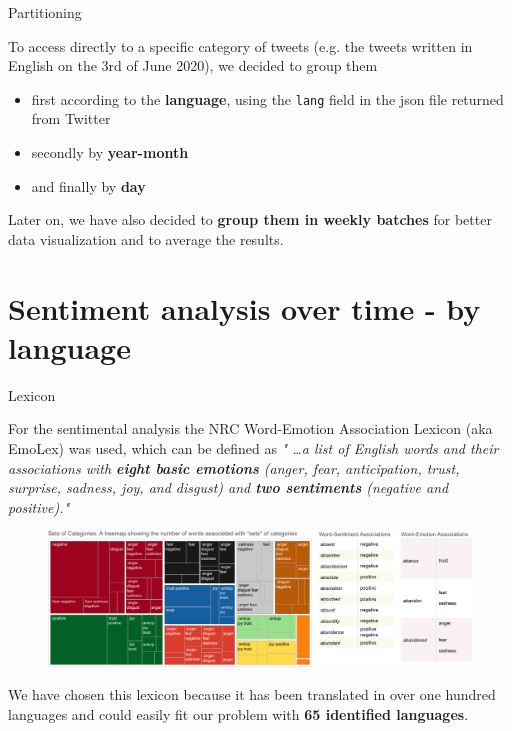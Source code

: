 \documentclass[8pt]{beamer}  %
\begin{document}
\begin{frame}{Partitioning}

	To access directly to a specific category of tweets (e.g. the tweets written in English on the 3rd of June 2020), we decided to group them 
	
	\begin{itemize}
	    \item first according to the \textbf{language}, using the \texttt{lang} field in the json file returned from Twitter
	    \item secondly by \textbf{year-month}
	    \item and finally by \textbf{day}
	\end{itemize}
	
    Later on, we have also decided to \textbf{group them in weekly batches} for better data visualization and to average the results.

\end{frame}

\section{Sentiment analysis over time - by language}

\begin{frame}{Lexicon}

	For the sentimental analysis the NRC Word-Emotion Association Lexicon (aka EmoLex) \autocite{ncrwebsite} was used, which can be defined as \textit{" \ldots a list of English words and their associations with \textbf{eight basic emotions} (anger, fear, anticipation, trust, surprise, sadness, joy, and disgust) and \textbf{two sentiments} (negative and positive)."}
	
	\begin{figure}
	    \centering
	    \includegraphics[scale=0.26]{assets/img/NRC Emotion Lexicon.png}
	\end{figure}
	
	We have chosen this lexicon because it has been translated in over one hundred languages and could easily fit our problem with \textbf{65 identified languages}.

\end{frame}
\end{document}

